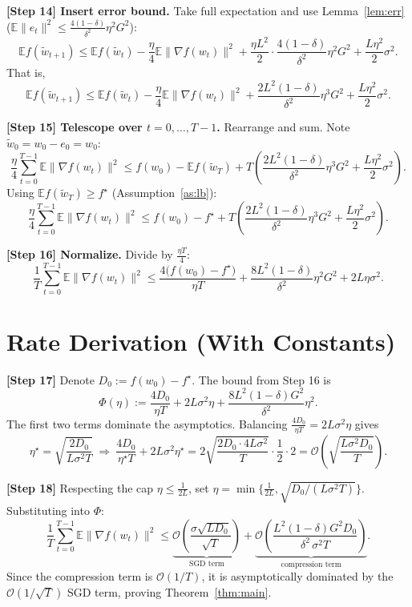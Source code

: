 \documentclass[11pt]{article}
\theoremstyle{plain}
\begin{document}
\medskip
\textbf{[Step 14] Insert error bound.}
Take full expectation and use Lemma~\ref{lem:err} ($\mathbb{E}\|e_t\|^2\le\frac{4(1-\delta)}{\delta^2}\eta^2G^2$):
\[
\mathbb{E}f(\tilde w_{t+1})\le \mathbb{E}f(\tilde w_t)
-\frac{\eta}{4}\mathbb{E}\|\nabla f(w_t)\|^2
+\frac{\eta L^2}{2}\cdot\frac{4(1-\delta)}{\delta^2}\eta^2G^2
+\frac{L\eta^2}{2}\sigma^2 .
\]
That is,
\[
\mathbb{E}f(\tilde w_{t+1})\le \mathbb{E}f(\tilde w_t)
-\frac{\eta}{4}\mathbb{E}\|\nabla f(w_t)\|^2
+\frac{2L^2(1-\delta)}{\delta^2}\eta^3G^2
+\frac{L\eta^2}{2}\sigma^2 .
\]

\medskip
\textbf{[Step 15] Telescope over $t=0,\dots,T-1$.}
Rearrange and sum. Note $\tilde w_0=w_0-e_0=w_0$:
\[
\frac{\eta}{4}\sum_{t=0}^{T-1}\mathbb{E}\|\nabla f(w_t)\|^2
\le f(w_0)-\mathbb{E}f(\tilde w_T)
+T\!\left(\frac{2L^2(1-\delta)}{\delta^2}\eta^3G^2+\frac{L\eta^2}{2}\sigma^2\right).
\]
Using $\mathbb{E}f(\tilde w_T)\ge f^\star$ (Assumption~\ref{as:lb}):
\[
\frac{\eta}{4}\sum_{t=0}^{T-1}\mathbb{E}\|\nabla f(w_t)\|^2
\le f(w_0)-f^\star
+T\!\left(\frac{2L^2(1-\delta)}{\delta^2}\eta^3G^2+\frac{L\eta^2}{2}\sigma^2\right).
\]

\medskip
\textbf{[Step 16] Normalize.}
Divide by $\frac{\eta T}{4}$:
\[
\boxed{\;
\frac{1}{T}\sum_{t=0}^{T-1}\mathbb{E}\|\nabla f(w_t)\|^2
\le \frac{4\big(f(w_0)-f^\star\big)}{\eta T}
+\frac{8L^2(1-\delta)}{\delta^2}\eta^2G^2
+2L\eta\sigma^2 .
\;}
\]

\section*{Rate Derivation (With Constants)}

\textbf{[Step 17]} Denote $D_0:=f(w_0)-f^\star$. The bound from Step 16 is
\[
\Phi(\eta):=\frac{4D_0}{\eta T}+2L\sigma^2\eta+\frac{8L^2(1-\delta)G^2}{\delta^2}\eta^2 .
\]
The first two terms dominate the asymptotics. Balancing $\frac{4D_0}{\eta T}=2L\sigma^2\eta$ gives
\[
\eta^\star=\sqrt{\frac{2D_0}{L\sigma^2 T}}\ \Longrightarrow\ \frac{4D_0}{\eta^\star T}+2L\sigma^2\eta^\star
= 2\sqrt{\frac{2 D_0\cdot 4 L\sigma^2}{T}}\cdot\frac{1}{2}\cdot 2
=\mathcal{O}\!\left(\sqrt{\frac{L\sigma^2 D_0}{T}}\right).
\]

\textbf{[Step 18]} Respecting the cap $\eta\le\frac{1}{2L}$, set
$\eta=\min\big\{\tfrac{1}{2L},\sqrt{D_0/(L\sigma^2T)}\big\}$. Substituting into $\Phi$:
\[
\frac{1}{T}\sum_{t=0}^{T-1}\mathbb{E}\|\nabla f(w_t)\|^2
\le
\underbrace{\mathcal{O}\!\left(\frac{\sigma\sqrt{L D_0}}{\sqrt{T}}\right)}_{\text{SGD term}}
+\underbrace{\mathcal{O}\!\left(\frac{L^2(1-\delta)G^2 D_0}{\delta^2\,\sigma^2 T}\right)}_{\text{compression term}} .
\]
Since the compression term is $\mathcal{O}(1/T)$, it is asymptotically dominated by the $\mathcal{O}(1/\sqrt{T})$ SGD term, proving Theorem~\ref{thm:main}.
\end{document}
